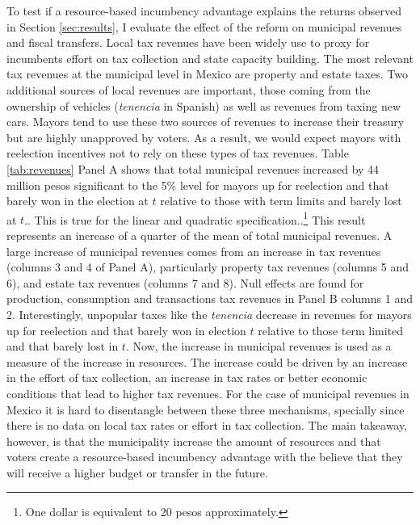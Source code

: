\documentclass[12pt]{amsart}
\numberwithin{equation}{section}
\theoremstyle{definition}
\theoremstyle{definition}
\theoremstyle{definition}
\begin{document}
To test if a resource-based incumbency advantage explains the returns observed in Section \ref{sec:results}, I evaluate the effect of the reform on municipal revenues and fiscal transfers. Local tax revenues have been widely use to proxy for incumbents effort on tax collection and state capacity building. The most relevant tax revenues at the municipal level in Mexico are property and estate taxes. Two additional sources of local revenues are important, those coming from the ownership of vehicles (\emph{tenencia} in Spanish) as well as revenues from taxing new cars. Mayors tend to use these two sources of revenues to increase their treasury but are highly unapproved by voters. As a result, we would expect mayors with reelection incentives not to rely on these types of tax revenues. Table \ref{tab:revenues} Panel A shows that total municipal revenues increased by 44 million pesos significant to the 5\% level for mayors up for reelection and that barely won in the election at $t$ relative to those with term limits and barely lost at $t$..  This is true for the linear and quadratic specification..\footnote{One dollar is equivalent to 20 pesos approximately.} This result represents an increase of a quarter of the mean of total municipal revenues. A large increase of municipal revenues comes from an increase in tax revenues (columns 3 and 4 of Panel A), particularly property tax revenues (columns 5 and 6), and estate tax revenues (columns 7 and 8). Null effects are found for production, consumption and transactions tax revenues in Panel B columns 1 and 2. Interestingly, unpopular taxes like the \emph{tenencia} decrease in revenues for mayors up for reelection and that barely won in election $t$ relative to those term limited and that barely lost in $t$. Now, the increase in municipal revenues is used as a measure of the increase in resources. The increase could be driven by an increase in the effort of tax collection, an increase in tax rates or better economic conditions that lead to higher tax revenues. For the case of municipal revenues in Mexico it is hard to disentangle between these three mechanisms, specially since there is no data on local tax rates or effort in tax collection. The main takeaway, however, is that the municipality increase the amount of resources and that voters create a resource-based incumbency advantage with the believe that they will receive a higher budget or transfer in the future. %
\end{document}
